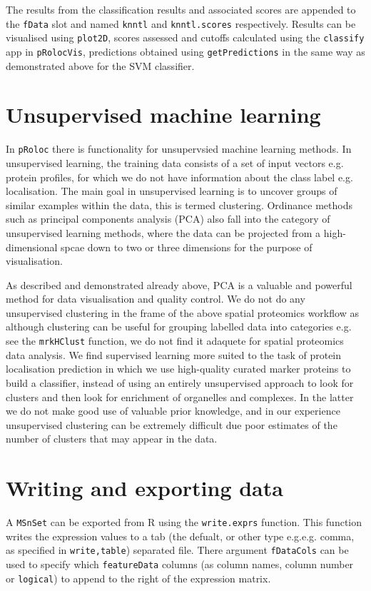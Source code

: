 The results from the classification results and associated scores are
appended to the \texttt{fData} slot and named \texttt{knntl} and
\texttt{knntl.scores} respectively. Results can be visualised using
\texttt{plot2D}, scores assessed and cutoffs calculated using the
\texttt{classify} app in \texttt{pRolocVis}, predictions obtained
using \texttt{getPredictions} in the same way as demonstrated above
for the SVM classifier.


\section*{Unsupervised machine learning}

In \texttt{pRoloc} there is functionality for unsupervsied machine
learning methods. In unsupervised learning, the training data consists
of a set of input vectors e.g. protein profiles, for which we do not
have information about the class label e.g. localisation. The main
goal in unsupervised learning is to uncover groups of similar examples
within the data, this is termed clustering. Ordinance methods such as
principal components analysis (PCA) also fall into the category of
unsupervised learning methods, where the data can be projected from a
high-dimensional spcae down to two or three dimensions for the purpose
of visualisation.

As described and demonstrated already above, PCA is a valuable and
powerful method for data visualisation and quality control. We do not
do any unsupervised clustering in the frame of the above spatial
proteomics workflow as although clustering can be useful for grouping
labelled data into categories e.g. see the \texttt{mrkHClust}
function, we do not find it adaquete for spatial proteomics data
analysis. We find supervised learning more suited to the task of
protein localisation prediction in which we use high-quality curated
marker proteins to build a classifier, instead of using an entirely
unsupervised approach to look for clusters and then look for
enrichment of organelles and complexes. In the latter we do not make
good use of valuable prior knowledge, and in our experience
unsupervised clustering can be extremely difficult due poor estimates
of the number of clusters that may appear in the data.

\section*{Writing and exporting data}

A \texttt{MSnSet} can be exported from R using the
\texttt{write.exprs} function.  This function writes the expression
values to a tab (the defualt, or other type e.g.e.g. comma, as
specified in \texttt{write,table}) separated file. There argument
\texttt{fDataCols} can be used to specify which \texttt{featureData}
columns (as column names, column number or \texttt{logical}) to append
to the right of the expression matrix.

